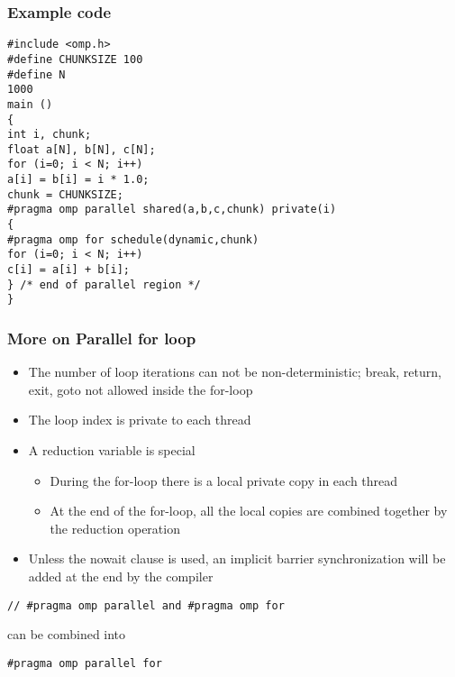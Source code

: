 \documentclass{beamer}
\begin{document}
\begin{frame}
\frametitle{Example code}

\begin{block}{}
\begin{verbatim}
#include <omp.h>
#define CHUNKSIZE 100
#define N
1000
main ()
{
int i, chunk;
float a[N], b[N], c[N];
for (i=0; i < N; i++)
a[i] = b[i] = i * 1.0;
chunk = CHUNKSIZE;
#pragma omp parallel shared(a,b,c,chunk) private(i)
{
#pragma omp for schedule(dynamic,chunk)
for (i=0; i < N; i++)
c[i] = a[i] + b[i];
} /* end of parallel region */
}
\end{verbatim}


\end{block}
\end{frame}

\begin{frame}
\frametitle{More on Parallel for loop}

\begin{block}{}
\begin{itemize}
\item The number of loop iterations can not be non-deterministic; break, return, exit, goto not allowed inside the for-loop

\item The loop index is private to each thread

\item A reduction variable is special
\begin{itemize}

  \item During the for-loop there is a local private copy in each thread

  \item At the end of the for-loop, all the local copies are combined together by the reduction operation

\end{itemize}

\noindent
\item Unless the nowait clause is used, an implicit barrier synchronization will be added at the end by the compiler
\end{itemize}

\noindent
\begin{verbatim}
// #pragma omp parallel and #pragma omp for
\end{verbatim}
can be combined into
\begin{verbatim}
#pragma omp parallel for
\end{verbatim}


\end{block}
\end{frame}
\end{document}
